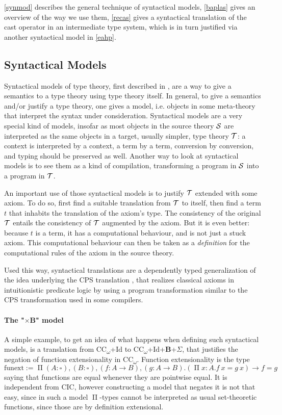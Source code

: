 \documentclass{kaobook}
\renewcommand{\mathtt}{\mathrm}
\newcommand{\uni}[1][]{\square_{#1}}
\renewcommand{\P}{\operatorname{\Pi}}
\DeclareMathOperator{\?}{?}
\newcommand{\bool}{\mathbf{B}}
\newcommand{\coc}{CC\textsubscript{$\omega$}}
\begin{document}
{\autoref{synmod} describes the general technique of syntactical models, \autoref{baplas} gives an overview of the way we use them, \autoref{recas} gives a syntactical translation of the cast operator in an intermediate type system, which is in turn justified via another syntactical model in \autoref{eahp}.

\subsection{Syntactical Models}
\label{synmod}

Syntactical models of type theory, first described in \cite{Boulier2017}, are a way to give a semantics to a type theory using type theory itself. In general, to give a semantics and/or justify a type theory, one gives a model, i.e. objects in some meta-theory that interpret the syntax under consideration. Syntactical models are a very special kind of models, insofar as most objects in the source theory $\mathcal{S}$ are interpreted as the same objects in a target, usually simpler, type theory $\mathcal{T}$: a context is interpreted by a context, a term by a term, conversion by conversion, and typing should be preserved as well. Another way to look at syntactical models is to see them as a kind of compilation, transforming a program in $\mathcal{S}$ into a program in $\mathcal{T}$.

An important use of those syntactical models is to justify $\mathcal{T}$ extended with some axiom. To do so, first find a suitable translation from $\mathcal{T}$ to itself, then find a term $t$ that inhabits the translation of the axiom's type. The consistency of the original $\mathcal{T}$ entails the consistency of $\mathcal{T}$ augmented by the axiom. But it is even better: because $t$ is a term, it has a computational behaviour, and is not just a stuck axiom. This computational behaviour can then be taken as a \emph{definition} for the computational rules of the axiom in the source theory.

Used this way, syntactical translations are a dependently typed generalization of the idea underlying the CPS translation \cite{Griffin1990}, that realizes classical axioms in intuitionistic predicate logic by using a program transformation similar to the CPS transformation used in some compilers.

\paragraph{The "$\times \bool$" model}

A simple example, to get an idea of what happens when defining such syntactical models, is a translation from \coc+$\mathtt{Id}$ to \coc+$\mathtt{Id}$+$\bool$+$\Sigma$, that justifies the negation of function extensionality in \coc. Function extensionality is the type
\[\mathtt{funext} := \P (A : \uni), (B : \uni), (f : A \to B), (g : A \to B). (\P x : A. f~x = g~x) \to f = g \]
saying that functions are equal whenever they are pointwise equal. It is independent from CIC, however constructing a model that negates it is not that easy, since in such a model $\P$-types cannot be interpreted as usual set-theoretic functions, since those are by definition extensional.

}
\end{document}
